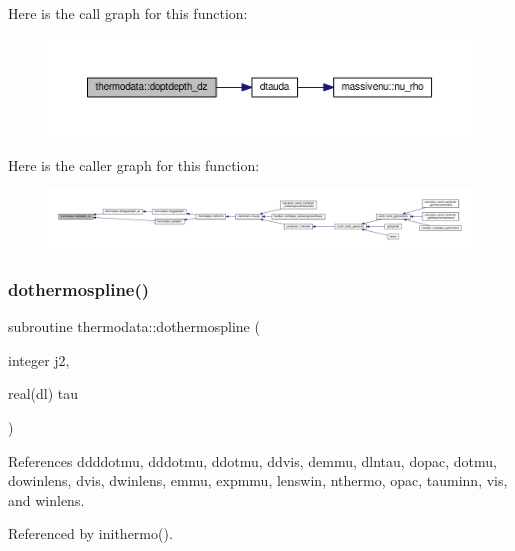 Here is the call graph for this function\+:
\nopagebreak
\begin{figure}[H]
\begin{center}
\leavevmode
\includegraphics[width=350pt]{namespacethermodata_afdafed82de5a75a5b609d945a91836fa_cgraph}
\end{center}
\end{figure}
Here is the caller graph for this function\+:
\nopagebreak
\begin{figure}[H]
\begin{center}
\leavevmode
\includegraphics[width=350pt]{namespacethermodata_afdafed82de5a75a5b609d945a91836fa_icgraph}
\end{center}
\end{figure}
\mbox{\label{namespacethermodata_a1c7e7a0884bd2117c1d24a1ce8d5aaf1}} 
\subsubsection{\texorpdfstring{dothermospline()}{dothermospline()}}
{\footnotesize\ttfamily subroutine thermodata\+::dothermospline (\begin{DoxyParamCaption}\item[{integer}]{j2,  }\item[{real(dl)}]{tau }\end{DoxyParamCaption})\hspace{0.3cm}{\ttfamily [private]}}



References ddddotmu, dddotmu, ddotmu, ddvis, demmu, dlntau, dopac, dotmu, dowinlens, dvis, dwinlens, emmu, expmmu, lenswin, nthermo, opac, tauminn, vis, and winlens.



Referenced by inithermo().

